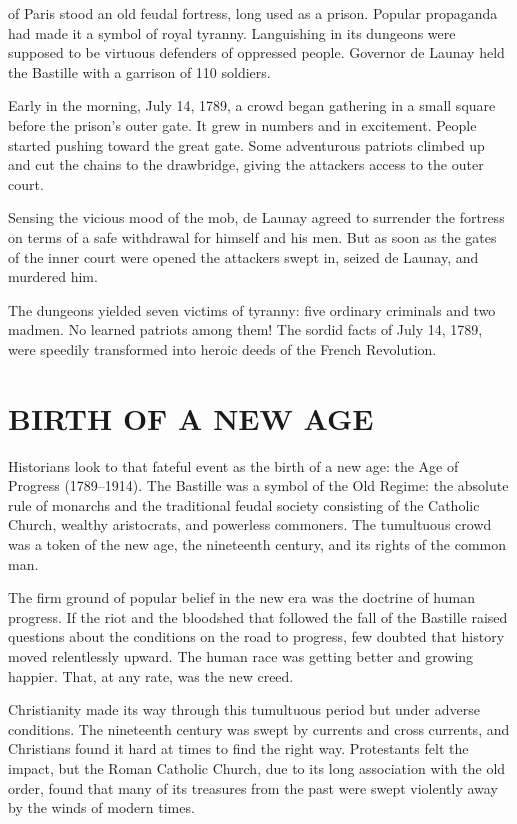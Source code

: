 
 of Paris stood an old feudal fortress, long used as a prison. Popular
propaganda had made it a symbol of royal tyranny. Languishing in its dungeons were supposed to be
virtuous defenders of oppressed people. Governor de Launay held the Bastille with a garrison of 110
soldiers.

Early in the morning, July 14, 1789, a crowd began gathering in a small square before the prison’s
outer gate. It grew in numbers and in excitement. People started pushing toward the great gate. Some
adventurous patriots climbed up and cut the chains to the drawbridge, giving the attackers access to
the outer court.

Sensing the vicious mood of the mob, de Launay agreed to surrender the fortress on terms of a safe
withdrawal for himself and his men. But as soon as the gates of the inner court were opened the
attackers swept in, seized de Launay, and murdered him.

The dungeons yielded seven victims of tyranny: five ordinary criminals and two madmen. No learned
patriots among them! The sordid facts of July 14, 1789, were speedily transformed into heroic deeds
of the French Revolution.

\section{BIRTH OF A NEW AGE}

Historians look to that fateful event as the birth of a new age: the Age of Progress (1789–1914).
The Bastille was a symbol of the Old Regime: the absolute rule of monarchs and the traditional
feudal society consisting of the Catholic Church, wealthy aristocrats, and powerless commoners. The
tumultuous crowd was a token of the new age, the nineteenth century, and its rights of the common
man.

The firm ground of popular belief in the new era was the doctrine of human progress. If the riot and
the bloodshed that followed the fall of the Bastille raised questions about the conditions on the
road to progress, few doubted that history moved relentlessly upward. The human race was getting
better and growing happier. That, at any rate, was the new creed.

Christianity made its way through this tumultuous period but under adverse conditions. The
nineteenth century was swept by currents and cross currents, and Christians found it hard at times
to find the right way. Protestants felt the impact, but the Roman Catholic Church, due to its long
association with the old order, found that many of its treasures from the past were swept violently
away by the winds of modern times.

